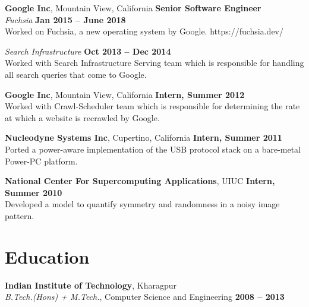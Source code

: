 \documentclass[margin,line]{resume}
\begin{document}
\begin{resume}
    \textbf{Google Inc}, Mountain View, California \hfill \textbf{Senior Software Engineer} \vspace{2mm}\\\vspace{1mm}%
    \textsl{Fuchsia} \hfill \textbf{Jan 2015 -- June 2018}\\
    Worked on Fuchsia, a new operating system by Google.
    https://fuchsia.dev/

    \textsl{Search Infrastructure} \hfill \textbf{Oct 2013 -- Dec 2014}\vspace{1.5mm}\\\vspace{0mm}%
     Worked with Search Infrastructure Serving team which is responsible for handling all search queries that come to Google. 

    \textbf{Google Inc}, Mountain View, California \hfill \textbf{Intern, Summer 2012} \vspace{2mm}\\\vspace{1mm}%
    Worked with Crawl-Scheduler team which is responsible for determining the rate at which a website is recrawled by Google.

    \textbf{Nucleodyne Systems Inc}, Cupertino, California \hfill \textbf{Intern, Summer 2011} \vspace{2mm}\\\vspace{1mm}%
    Ported a power-aware implementation of the USB protocol stack on a bare-metal Power-PC platform.

   \textbf{National Center For Supercomputing Applications}, UIUC \hfill \textbf{Intern, Summer 2010} \vspace{2mm}\\\vspace{1mm}%
    Developed a model to quantify symmetry and randomness in a noisy image pattern.

    \section{\mysidestyle Education}

    \textbf{Indian Institute of Technology}, Kharagpur \vspace{2mm}\\\vspace{1mm}%
    \textsl{B.Tech.(Hons) + M.Tech.}, Computer Science and Engineering \hfill \textbf{ 2008 -- 2013}\vspace{-3mm}\\\vspace{-1mm}%


\end{resume}
\end{document}
